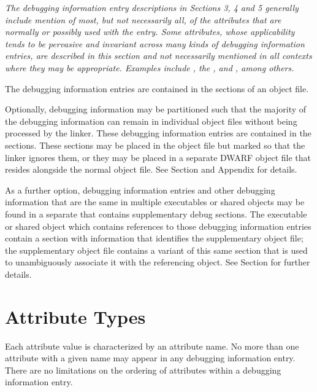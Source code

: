 \textit{The debugging information entry descriptions 
in Sections 3, 4 and 5 generally include mention of
most, but not necessarily all, of the attributes 
that are normally or possibly used with the entry.
Some attributes, whose applicability tends to be 
pervasive and invariant across many kinds of
debugging information entries, are described in 
this section and not necessarily mentioned in all
contexts where they may be appropriate. 
Examples include 
\DWATartificial, 
the , and 
\DWATdescription, 
among others.}

The debugging information entries are contained in the 
\dotdebuginfo{} sections of an object file.

Optionally, debugging information may be partitioned such
that the majority of the debugging information can remain in
individual object files without being processed by the
linker. These debugging information entries are contained in
the \dotdebuginfodwo{} sections. These
sections may be placed in the object file but marked so that
the linker ignores them, or they may be placed in a separate
DWARF object file that resides alongside the normal object
file. See Section  and
Appendix  for details.

As a further option, debugging information entries and other debugging
information that are the same in multiple executables or shared objects 
may be found in a separate  that 
contains supplementary debug sections.
The executable or shared object which contains references to
those debugging information entries contain a \dotdebugsup{} section
with information that identifies the supplementary object file; the 
supplementary object file contains a variant of this same section
that is used to unambiguously associate it with the referencing object.
See Section  for
further details.
 
\section{Attribute Types}
\label{chap:attributetypes}
Each attribute value is characterized by an attribute name. 
No more than one attribute with a given name may appear in any
debugging information entry. 
There are no limitations on the
ordering of attributes within a debugging information entry.

